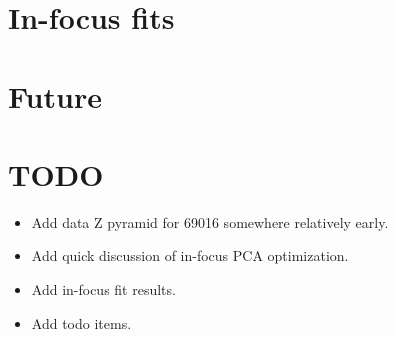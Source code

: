 \documentclass{article}
\begin{document}
\section{In-focus fits} \section{Future}

\section{TODO}

\begin{itemize}
  \item Add data Z pyramid for 69016 somewhere relatively early.
  \item Add quick discussion of in-focus PCA optimization.
  \item Add in-focus fit results.
  \item Add todo items.
\end{itemize}
\end{document}
